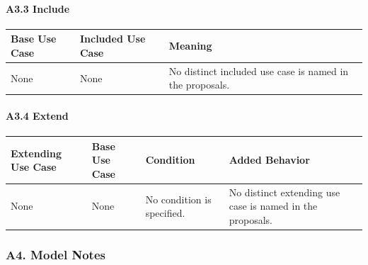 \documentclass[12pt]{article}
\renewcommand{\baselinestretch}{1.5}
\begin{document}
\hypertarget{sec:a3-3-include}{}
\paragraph*{A3.3 Include}
\par\medskip

\begingroup
\small
\renewcommand{\baselinestretch}{1.0}\selectfont
\renewcommand{\arraystretch}{1.15}
\setlength{\tabcolsep}{6pt}
\begin{longtable}{|>{\raggedright\arraybackslash}p{}|>{\raggedright\arraybackslash}p{}|>{\raggedright\arraybackslash}p{}|}
\hline
\textbf{Base Use Case} & \textbf{Included Use Case} & \textbf{Meaning} \\ \hline
\endhead
None & None & No distinct included use case is named in the proposals. \\ \hline
\end{longtable}
\endgroup
\par\medskip

\hypertarget{sec:a3-4-extend}{}
\paragraph*{A3.4 Extend}
\par\medskip

\begingroup
\small
\renewcommand{\baselinestretch}{1.0}\selectfont
\renewcommand{\arraystretch}{1.15}
\setlength{\tabcolsep}{6pt}
\begin{longtable}{|>{\raggedright\arraybackslash}p{}|>{\raggedright\arraybackslash}p{}|>{\raggedright\arraybackslash}p{}|>{\raggedright\arraybackslash}p{}|}
\hline
\textbf{Extending Use Case} & \textbf{Base Use Case} & \textbf{Condition} & \textbf{Added Behavior} \\ \hline
\endhead
None & None & No condition is specified. & No distinct extending use case is named in the proposals. \\ \hline
\end{longtable}
\endgroup
\par\medskip

\hypertarget{sec:a4-model-notes}{}
\subsubsection*{A4. Model Notes}
\par\medskip
\end{document}
